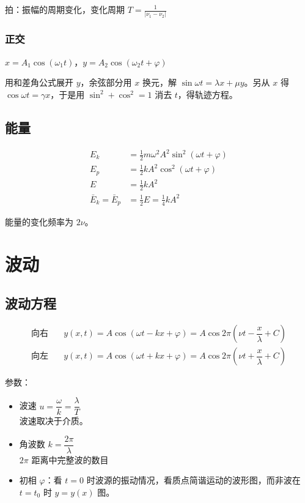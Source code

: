 \documentclass[12pt, a4paper, UTF8, openany]{ctexbook}
\begin{document}
        拍：振幅的周期变化，变化周期 $T = \frac{1}{|\nu_1 - \nu_2|}$

        \subsubsection{正交}
        $x = A_1\cos(\omega_1 t)$，$y = A_2\cos(\omega_2 t + \varphi)$

        用和差角公式展开 $y$，余弦部分用 $x$ 换元，解 $\sin \omega t = \lambda x + \mu y$。另从 $x$ 得 $\cos \omega t = \gamma x$，于是用 $\sin^2 + \cos^2 = 1$ 消去 $t$，得轨迹方程。

        \subsection{能量}
        $$\begin{aligned}
            E_k &= \frac{1}{2} m \omega^2 A^2 \sin^2(\omega t + \varphi) \\ 
            E_p &= \frac{1}{2} k A^2 \cos^2(\omega t + \varphi) \\
            E &= \frac{1}{2} k A^2 \\
            \bar{E}_k = \bar{E}_p &= \frac{1}{2} E = \frac{1}{4} k A^2
        \end{aligned}$$

        能量的变化频率为 $2 \nu$。

    \section{波动}
        \subsection{波动方程}
        $$\begin{aligned}
            \text{向右} &\quad y(x, t) = A \cos (\omega t - kx + \varphi) = A \cos 2\pi (\nu t - \dfrac{x}{\lambda} + C) \\
            \text{向左} &\quad y(x, t) = A \cos (\omega t + kx + \varphi) = A \cos 2\pi (\nu t + \dfrac{x}{\lambda} + C)
        \end{aligned}$$

        参数：
        \begin{itemize}
            \item 波速 $u = \dfrac{\omega}{k} = \dfrac{\lambda}{T}$ \\
                波速取决于介质。
            \item 角波数 $k = \dfrac{2\pi}{\lambda}$ \\
                $2 \pi$ 距离中完整波的数目
            \item 初相 $\varphi$：看 $t = 0$ 时{\heiti 波源}的振动情况，看质点简谐运动的波形图，而非波在 $t = t_0$ 时 $y = y(x)$ 图。
        \end{itemize}
\end{document}
